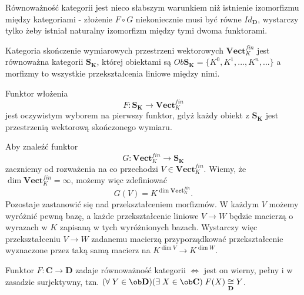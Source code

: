 Równoważność kategorii jest nieco słabszym warunkiem niż istnienie izomorfizmu między kategoriami - złożenie $F\circ G$ niekoniecznie musi być równe $Id_{\mathbf{D}}$, wystarczy tylko żeby istniał naturalny izomorfizm między tymi dwoma funktorami.

\begin{example}
\item Kategoria skończenie wymiarowych przestrzeni wektorowych $\mathbf{Vect}_K^{fin}$ jest równoważna kategorii $\mathbf{S_K}$, której obiektami są $Ob\mathbf{S_K}=\{K^0,K^1,...,K^n,...\}$ a morfizmy to wszystkie przekształcenia liniowe między nimi.

  Funktor włożenia
  $$F:\mathbf{S_K}\to \mathbf{Vect}_K^{fin}$$
  jest oczywistym wyborem na pierwszy funktor, gdyż każdy obiekt z $\mathbf{S_K}$ jest przestrzenią wektorową skończonego wymiaru.

  Aby znaleźć funktor
  $$G:\mathbf{Vect}_K^{fin}\to\mathbf{S_K}$$
  zaczniemy od rozważenia na co przechodzi $V\in\mathbf{Vect}_K^{fin}$. Wiemy, że $\dim\mathbf{Vect}_K^{fin}=\infty$, możemy więc zdefiniować
  $$G(V)=K^{\dim\mathbf{Vect}_K^{fin}}.$$
  Pozostaje zastanowić się nad przekształceniem morfizmów. W każdym $V$ możemy wyróżnić pewną bazę, a każde przekształcenie liniowe $V\to W$ będzie macierzą o wyrazach w $K$ zapisaną w tych wyróżnionych bazach. Wystarczy więc przekształceniu $V\to W$ zadanemu macierzą przyporządkować przekształcenie wyznaczone przez taką samą macierz na $K^{\dim V}\to K^{\dim W}$.

\end{example}

\begin{theorem}
  Funktor $F:\mathbf{C}\to \mathbf{D}$ zadaje równoważność kategorii $\iff$ jest on wierny, pełny i w zasadzie surjektywny, tzn. $(\forall\;Y\in \ob\mathbf{D})(\exists\;X\in \ob\mathbf{C})\;F(X)\underset{\mathbf{D}}{\cong}Y$.
\end{theorem}

